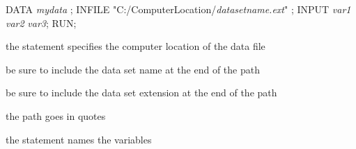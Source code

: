 \begin{frame}[fragile]
\footnotesize
\begin{code}{.0}
DATA \emph{mydata} ;
   INFILE "C:/ComputerLocation/\emph{datasetname.ext}" ;
   INPUT \emph{var1} \emph{var2} \emph{var3};
RUN;
\end{code}
\emp
\vskip5pt
\bi
\item the  statement specifies the computer location of the data file
\bi
\item be sure to include the data set name at the end of the path
\item be sure to include the data set extension at the end of the path
\item the path goes in quotes
\ei
\item the  statement names the variables
\ei
\end{frame}


